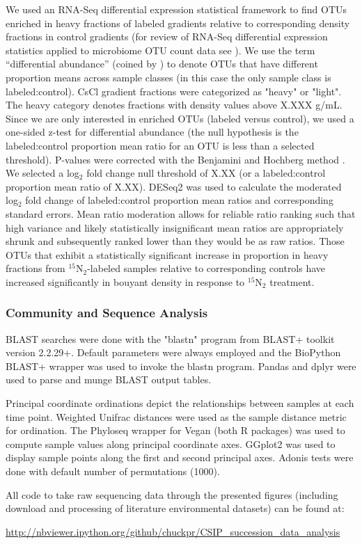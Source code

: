 We used an RNA-Seq differential expression statistical framework
\citep{Love_2014} to find OTUs enriched in heavy fractions of labeled
gradients relative to corresponding density fractions in control gradients
(for review of RNA-Seq differential expression statistics applied to
microbiome OTU count data see \citet{24699258}). We use the term
“differential abundance” (coined by \citet{24699258}) to denote OTUs that
have different proportion means across sample classes (in this case the only
sample class is labeled:control).  CsCl gradient fractions were categorized
as "heavy" or "light". The heavy category denotes fractions with density
values above X.XXX g/mL. Since we are only interested in enriched OTUs
(labeled versus control), we used a one-sided z-test for differential
abundance (the null hypothesis is the labeled:control proportion mean ratio
for an OTU is less than a selected threshold). P-values were corrected with
the Benjamini and Hochberg method \citep{citeulike:1042553}. We selected a
log$_{2}$ fold change null threshold of X.XX (or a labeled:control proportion
mean ratio of X.XX). DESeq2 was used to calculate the moderated log$_{2}$
fold change of labeled:control proportion mean ratios and corresponding
standard errors. Mean ratio moderation allows for reliable ratio ranking such
that high variance and likely statistically insignificant mean ratios are
appropriately shrunk and subsequently ranked lower than they would be as raw
ratios. Those OTUs that exhibit a statistically significant increase in
proportion in heavy fractions from $^{15}$N$_{2}$-labeled samples relative to
corresponding controls have increased significantly in bouyant density in
response to $^{15}$N$_{2}$ treatment.

\subsubsection{Community and Sequence Analysis}
BLAST searches were done with the "blastn" program from BLAST+ toolkit
\citep{20003500} version 2.2.29+. Default parameters were always employed and
the BioPython \citep{19304878} BLAST+ wrapper was used to invoke the blastn
program. Pandas \citep{citeulike:11241428} and dplyr \citep{dplyr} were used to
parse and munge BLAST output tables.  

Principal coordinate ordinations depict the relationships between
samples at each time point. Weighted Unifrac distances were
used as the sample distance metric for ordination. The Phyloseq
\citep{24699258} wrapper for Vegan \citep{vegan} (both R packages) was
used to compute sample values along principal coordinate axes. GGplot2
\citep{ggplot2} was used to display sample points along the first and
second principal axes. Adonis tests \cite{Anderson_2001} were done with default
number of permutations (1000).

All code to take raw sequencing data through the presented figures (including
download and processing of literature environmental datasets) can be
found at:

\url{http://nbviewer.ipython.org/github/chuckpr/CSIP_succession_data_analysis}